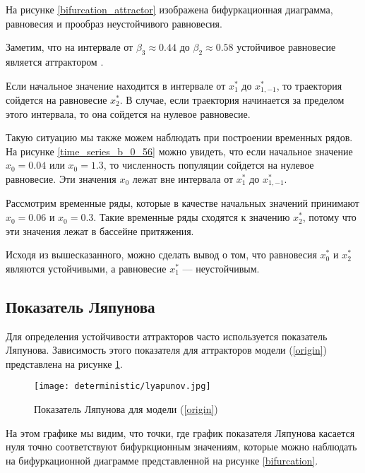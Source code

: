         На рисунке \ref{bifurcation_attractor} изображена бифуркационная диаграмма, равновесия и прообраз неустойчивого равновесия.

        Заметим, что на интервале от \(\beta_3 \approx 0.44\) до \(\beta_2 \approx 0.58\) устойчивое равновесие является аттрактором \cite{elementsOfNonlinearDynamic}.

        Если начальное значение находится в интервале от \(x_1^*\) до \(x_{1, -1}^*\), то траектория сойдется на равновесие \(x_2^*\). В случае, если траектория начинается за пределом этого интервала, то она сойдется на нулевое равновесие.

        Такую ситуацию мы также можем наблюдать при построении временных рядов. На рисунке \ref{time_series_b_0_56} можно увидеть, что если начальное значение \(x_0 = 0.04\) или \(x_0 = 1.3\), то численность популяции сойдется на нулевое равновесие. Эти значения \(x_0\) лежат вне интервала от \(x_1^*\) до \(x_{1, -1}^*\).

        Рассмотрим временные ряды, которые в качестве начальных значений принимают \(x_0 = 0.06\) и \(x_0 = 0.3\). Такие временные ряды сходятся к значению \(x_2^*\), потому что эти значения лежат в бассейне притяжения.

        Исходя из вышесказанного, можно сделать вывод о том, что равновесия \(x_0^*\) и \(x_2^*\) являются устойчивыми, а равновесие \(x_1^*\) --- неустойчивым.

    \subsection{Показатель Ляпунова}    

        Для определения устойчивости аттракторов часто используется показатель Ляпунова. Зависимость этого показателя для аттракторов модели (\ref{origin}) представлена на рисунке \ref{lyapunov}. 

        \begin{figure}
            \centering
            \texttt{[image: deterministic/lyapunov.jpg]}

            \captionsetup{justification=centering}
            \caption{Показатель Ляпунова для модели (\ref{origin})}
            \label{lyapunov}
        \end{figure}

        На этом графике мы видим, что точки, где график показателя Ляпунова касается нуля точно соответствуют бифуркционным значениям, которые можно наблюдать на бифуркационной диаграмме представленной на рисунке \ref{bifurcation}.

